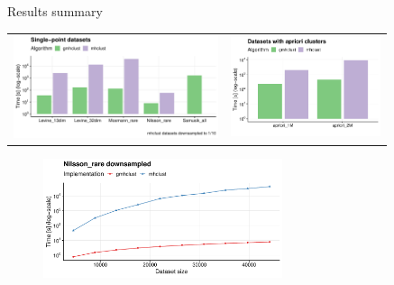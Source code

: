 \documentclass[10pt]{beamer}
\begin{document}
\begin{frame}{Results summary}
	
	\begin{tabular}{cc}
		\includegraphics[width=6cm]{img/mixed_perf_comp} & \includegraphics[width=4.4cm]{img/apriori_perf_comp} \\
	\end{tabular}
	\begin{figure}
		\includegraphics[width=7cm]{img/single_perf_comp}
	\end{figure}
	
\end{frame}
\end{document}
